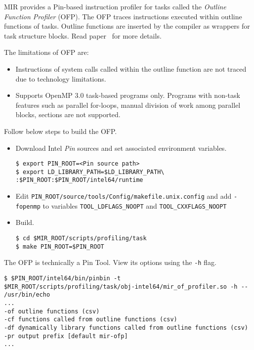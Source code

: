 \documentclass[11pt,a4paper]{article}
\begin{document}
MIR provides a Pin-based instruction profiler for tasks called the \textit{Outline Function Profiler} (OFP).
The OFP traces instructions executed within outline functions of tasks.
Outline functions are inserted by the compiler as wrappers for task structure blocks.
Read paper~\cite{muddukrishna2015characterizing} for more details.

The limitations of OFP are:
\begin{itemize}
    \item Instructions of system calls called within the outline function are not traced due to technology limitations.
    \item Supports OpenMP 3.0 task-based programs only. Programs with non-task features such as parallel for-loops, manual division of work among parallel blocks, sections are not supported.
\end{itemize}

Follow below steps to build the OFP.

\begin{itemize}
    \item Download Intel \textit{Pin} sources and set associated environment variables.

\begin{lstlisting}[style=MyInputStyle]
$ export PIN_ROOT=<Pin source path>
$ export LD_LIBRARY_PATH=$LD_LIBRARY_PATH\
:$PIN_ROOT:$PIN_ROOT/intel64/runtime
\end{lstlisting}

    \item Edit \texttt{PIN\_ROOT/source/tools/Config/makefile.unix.config} and add \texttt{-fopenmp} to variables \texttt{TOOL\_LDFLAGS\_NOOPT}  and \texttt{TOOL\_CXXFLAGS\_NOOPT}

    \item Build.

\begin{lstlisting}[style=MyInputStyle]
$ cd $MIR_ROOT/scripts/profiling/task
$ make PIN_ROOT=$PIN_ROOT
\end{lstlisting}
\end{itemize}

The OFP is technically a Pin Tool. View its options using the \texttt{-h} flag.

\begin{lstlisting}[style=MyInputStyle]
$ $PIN_ROOT/intel64/bin/pinbin -t $MIR_ROOT/scripts/profiling/task/obj-intel64/mir_of_profiler.so -h -- /usr/bin/echo
...
-of outline functions (csv)
-cf functions called from outline functions (csv)
-df dynamically library functions called from outline functions (csv)
-pr output prefix [default mir-ofp]
...
\end{lstlisting}
\end{document}
